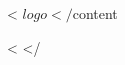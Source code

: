 \documentclass[a4paper,10pt]{article}
\begin{document}
<%
    ${logo}
</%

${content}

<%
</%
\end{document}
